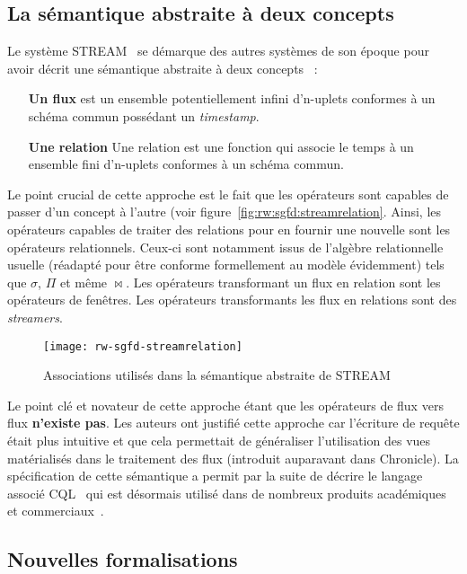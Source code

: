 \subsection{La sémantique abstraite à deux concepts}
Le système STREAM~\cite{Widom:queries, Arasu:stream} se démarque des autres systèmes de son époque pour avoir décrit une sémantique abstraite à deux concepts~\cite{Arasu:semantic} :
\begin{itemize}
 \item[\textbf{Un flux}] est un ensemble potentiellement infini d'n-uplets conformes à un schéma commun possédant un \textit{timestamp}.
 \item[\textbf{Une relation}] Une relation est une fonction qui associe le temps à un ensemble fini d'n-uplets conformes à un schéma commun.
\end{itemize}
Le point crucial de cette approche est le fait que les opérateurs sont capables de passer d'un concept à l'autre (voir figure~\ref{fig:rw:sgfd:streamrelation}. Ainsi, les opérateurs capables de traiter des relations pour en fournir une nouvelle sont les opérateurs relationnels. Ceux-ci sont notamment issus de l'algèbre relationnelle usuelle (réadapté pour être conforme formellement au modèle évidemment) tels que $\sigma$, $\Pi$ et même $\Join$. Les opérateurs transformant un flux en relation sont les opérateurs de fenêtres. Les opérateurs transformants les flux en relations sont des \textit{streamers}.
\begin{figure}[ht]
    \centering
    \texttt{[image: rw-sgfd-streamrelation]}
    \caption{Associations utilisés dans la sémantique abstraite de STREAM}
\end{figure}
Le point clé et novateur de cette approche étant que les opérateurs de flux vers flux \textbf{n'existe pas}. Les auteurs ont justifié cette approche car l'écriture de requête était plus intuitive et que cela permettait de généraliser l'utilisation des vues matérialisés dans le traitement des flux (introduit auparavant dans Chronicle). La spécification de cette sémantique a permit par la suite de décrire le langage associé CQL~\cite{Arasu:cql} qui est désormais utilisé dans de nombreux produits académiques et commerciaux~\cite{Witkowski:oraclecq,url:sqlstream}.



\subsection{Nouvelles formalisations}
